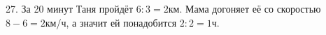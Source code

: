 27. За 20 минут Таня пройдёт $6:3=2$км. Мама догоняет её со скоростью $8-6=2$км/ч, а значит ей понадобится $2:2=1$ч.\\
